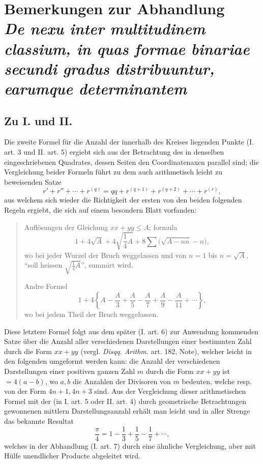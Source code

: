 \documentclass[12pt]{article}
\begin{document}
\section*{Bemerkungen zur Abhandlung\\
\emph{De nexu inter multitudinem classium, in quas formae binariae secundi gradus distribuuntur, earumque determinantem}}

\subsection*{Zu I. und II.}

Die zweite Formel für die Anzahl der innerhalb des Kreises liegenden Punkte (I. art. 3 und II. art. 5) ergiebt sich aus der Betrachtung des in denselben eingeschriebenen Quadrates, dessen Seiten den Coordinatenaxen parallel sind; die Vergleichung beider Formeln führt zu dem auch arithmetisch leicht zu beweisenden Satze
\[
r'+r''+\cdots+r^{(q)}=qq+r^{(q+1)}+r^{(q+2)}+\cdots+r^{(r)},
\]
aus welchem sich wieder die Richtigkeit der ersten von den beiden folgenden Regeln ergiebt, die sich auf einem besondern Blatt vorfanden:

\begin{quote}
Auflösungen der Gleichung \(xx+yy\leq A\); formula
\[
1+4\sqrt{A}+4\sqrt{\frac14A}+8\sum\bigl(\sqrt{A-nn}-n\bigr),
\]
wo bei jeder Wurzel der Bruch weggelassen und von \(n=1\) bis \(n=\sqrt A\), ``soll heissen \(\sqrt{\frac14A}\)'', summirt wird.

Andre Formel
\[
1+4\left\{A-\frac A3+\frac A5-\frac A7+\frac A9-\frac A{11}+\cdots\right\},
\]
wo bei jedem Theil der Bruch weggelassen.
\end{quote}

Diese letztere Formel folgt aus dem später (I. art. 6) zur Anwendung kommenden Satze über die Anzahl aller verschiedenen Darstellungen einer bestimmten Zahl durch die Form \(xx+yy\) (vergl. \emph{Disqq. Arithm.} art. 182, Note), welcher leicht in den folgenden umgeformt werden kann: die Anzahl der verschiedenen Darstellungen einer positiven ganzen Zahl \(m\) durch die Form \(xx+yy\) ist \(=4(a-b)\), wo \(a,b\) die Anzahlen der Divisoren von \(m\) bedeuten, welche resp. von der Form \(4n+1,4n+3\) sind. Aus der Vergleichung dieser arithmetischen Formel mit der (in I. art. 5 oder II. art. 4) durch geometrische Betrachtungen gewonnenen mittlern Darstellungsanzahl erhält man leicht und in aller Strenge das bekannte Resultat
\[
\frac{\pi}{4}=1-\frac13+\frac15-\frac17+\cdots,
\]
welches in der Abhandlung (I. art. 7) durch eine ähnliche Vergleichung, aber mit Hülfe unendlicher Producte abgeleitet wird.
\end{document}
